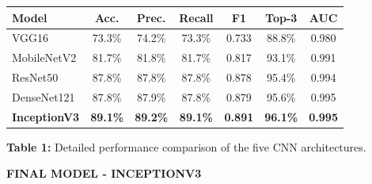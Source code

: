 \documentclass[final]{beamer}
\newcommand{\cardlabel}[1]{%
  {\fontsize{22}{26}\selectfont\bfseries\color{brand}\MakeUppercase{#1}}%
  \vspace{4pt}\par
}
\newlength{\colW}    \setlength{\colW}{22.8cm}  %
\newlength{\vgap}    \setlength{\vgap}{0.40cm}
\begin{document}
\begin{frame}[t]{}
\begin{minipage}[t]{\colW}
\begin{tcolorbox}[card]
  {\small\centering
  \begin{tabular}{@{}lcccccc@{}}
    \toprule
    \textbf{Model}
      & \textbf{Acc.}
      & \textbf{Prec.}
      & \textbf{Recall}
      & \textbf{F1}
      & \textbf{Top-3}
      & \textbf{AUC}\\
    \midrule
    VGG16        & 73.3\% & 74.2\% & 73.3\% & 0.733 & 88.8\% & 0.980\\
    MobileNetV2  & 81.7\% & 81.8\% & 81.7\% & 0.817 & 93.1\% & 0.991\\
    ResNet50     & 87.8\% & 87.8\% & 87.8\% & 0.878 & 95.4\% & 0.994\\
    DenseNet121  & 87.8\% & 87.9\% & 87.8\% & 0.879 & 95.6\% & 0.995\\
    \rowcolor{brandlight}
    \textbf{InceptionV3}
                 & \textbf{89.1\%}
                 & \textbf{89.2\%}
                 & \textbf{89.1\%}
                 & \textbf{0.891}
                 & \textbf{96.1\%}
                 & \textbf{0.995}\\
    \bottomrule
  \end{tabular}\par}

  \vspace{12pt}
  {\small\color{subtext}\centering
    \textbf{Table 1:} Detailed performance comparison of the five CNN architectures.\par}


\end{tcolorbox}

  \vspace{\vgap}

  \cardlabel{Final Model - InceptionV3}
  \begin{tcolorbox}[card]


\end{tcolorbox}
\end{minipage}
\end{frame}
\end{document}
